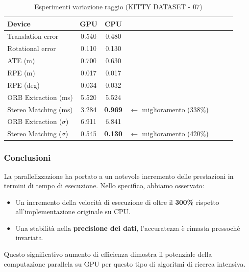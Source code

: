 \documentclass[12pt,a4paper]{report}
\begin{document}
\begin{table}[h]
    \centering
    \caption{Esperimenti variazione raggio (KITTY DATASET - 07) }
    \begin{tabular}{lcccccc}
        \toprule
        \rowcolor{gray!20}
        Device & \cellcolor{blue!20}GPU & \cellcolor{orange!20}CPU  \\
        \midrule
        Translation error & 0.540 & \cellcolor{green!20}0.480  \\
        Rotational error  & \cellcolor{green!20}0.110 & 0.130  \\
        ATE (m)           & 0.700 & \cellcolor{green!20}0.630  \\
        RPE (m)           & \cellcolor{green!20}0.017 & \cellcolor{green!20}0.017  \\
        RPE (deg)         & 0.034 & \cellcolor{green!20}0.032  \\
        ORB Extraction (ms) & \cellcolor{green!20}5.520 & 5.524 &&  \\
        Stereo Matching (ms) & 3.284 & \cellcolor{green!20}\textbf{0.969}  & $\xleftarrow{}$ miglioramento (338\%)\\
        ORB Extraction ($\sigma$) & 6.911 & \cellcolor{green!20}6.841  \\
        Stereo Matching ($\sigma$) & 0.545 & \cellcolor{green!20}\textbf{0.130} & $\xleftarrow{}$ miglioramento (420\%) \\
        \bottomrule
    \end{tabular}
\end{table}

\subsubsection{Conclusioni}

La parallelizzazione ha portato a un notevole incremento delle prestazioni in termini di tempo di esecuzione. Nello specifico, abbiamo osservato:
\begin{itemize}
\item Un incremento della velocità di esecuzione di oltre il \textbf{300\% }rispetto all'implementazione originale su CPU.
\item Una stabilità nella \textbf{precisione dei dati}, l'accuratezza è rimasta pressochè invariata.
\end{itemize}
Questo significativo aumento di efficienza dimostra il potenziale della computazione parallela su GPU per questo tipo di algoritmi di ricerca intensiva.
\end{document}
